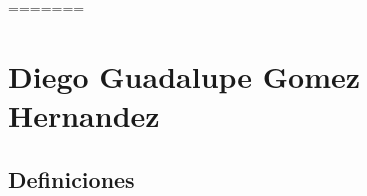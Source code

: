     \label{anexo:ensambleCircuitoElectrónicoESP32-C6.pdf}
    
    
=======
\section{Diego Guadalupe Gomez Hernandez}
\subsection{Definiciones}

